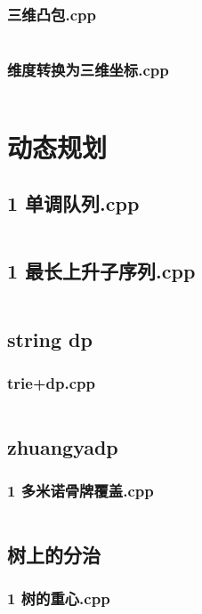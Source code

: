 \documentclass[a4paper,11pt]{article}
\begin{document}
\subsubsection{三维凸包.cpp}
\inputminted[breaklines]{c++}{"D:/tmplz/templates/几何/3D/三维凸包.cpp"}
\subsubsection{维度转换为三维坐标.cpp}
\inputminted[breaklines]{c++}{"D:/tmplz/templates/几何/3D/维度转换为三维坐标.cpp"}
\section{动态规划}
\subsection{1 单调队列.cpp}
\inputminted[breaklines]{c++}{"D:/tmplz/templates/动态规划/1 单调队列.cpp"}
\subsection{1 最长上升子序列.cpp}
\inputminted[breaklines]{c++}{"D:/tmplz/templates/动态规划/1 最长上升子序列.cpp"}
\subsection{string dp}
\subsubsection{trie+dp.cpp}
\inputminted[breaklines]{c++}{"D:/tmplz/templates/动态规划/string dp/trie+dp.cpp"}
\subsection{zhuangyadp}
\subsubsection{1 多米诺骨牌覆盖.cpp}
\inputminted[breaklines]{c++}{"D:/tmplz/templates/动态规划/zhuangyadp/1 多米诺骨牌覆盖.cpp"}
\subsection{树上的分治}
\subsubsection{1 树的重心.cpp}
\inputminted[breaklines]{c++}{"D:/tmplz/templates/动态规划/树上的分治/1 树的重心.cpp"}
\end{document}
